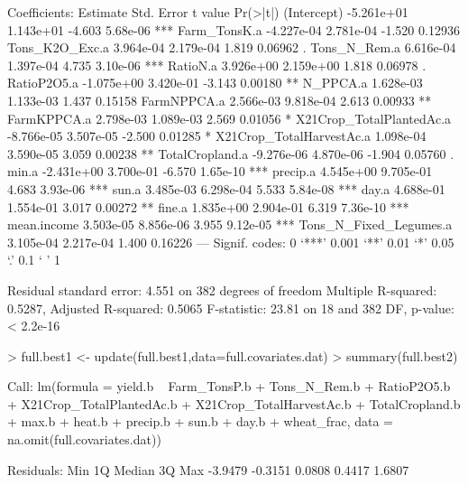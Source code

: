 \documentclass{report}
\begin{document}
\begin{Schunk}
\begin{Soutput}
Coefficients:
                           Estimate Std. Error t value Pr(>|t|)    
(Intercept)              -5.261e+01  1.143e+01  -4.603 5.68e-06 ***
Farm_TonsK.a             -4.227e-04  2.781e-04  -1.520  0.12936    
Tons_K2O_Exc.a            3.964e-04  2.179e-04   1.819  0.06962 .  
Tons_N_Rem.a              6.616e-04  1.397e-04   4.735 3.10e-06 ***
RatioN.a                  3.926e+00  2.159e+00   1.818  0.06978 .  
RatioP2O5.a              -1.075e+00  3.420e-01  -3.143  0.00180 ** 
N_PPCA.a                  1.628e-03  1.133e-03   1.437  0.15158    
FarmNPPCA.a               2.566e-03  9.818e-04   2.613  0.00933 ** 
FarmKPPCA.a               2.798e-03  1.089e-03   2.569  0.01056 *  
X21Crop_TotalPlantedAc.a -8.766e-05  3.507e-05  -2.500  0.01285 *  
X21Crop_TotalHarvestAc.a  1.098e-04  3.590e-05   3.059  0.00238 ** 
TotalCropland.a          -9.276e-06  4.870e-06  -1.904  0.05760 .  
min.a                    -2.431e+00  3.700e-01  -6.570 1.65e-10 ***
precip.a                  4.545e+00  9.705e-01   4.683 3.93e-06 ***
sun.a                     3.485e-03  6.298e-04   5.533 5.84e-08 ***
day.a                     4.688e-01  1.554e-01   3.017  0.00272 ** 
fine.a                    1.835e+00  2.904e-01   6.319 7.36e-10 ***
mean.income               3.503e-05  8.856e-06   3.955 9.12e-05 ***
Tons_N_Fixed_Legumes.a    3.105e-04  2.217e-04   1.400  0.16226    
---
Signif. codes:  0 ‘***’ 0.001 ‘**’ 0.01 ‘*’ 0.05 ‘.’ 0.1 ‘ ’ 1

Residual standard error: 4.551 on 382 degrees of freedom
Multiple R-squared:  0.5287,	Adjusted R-squared:  0.5065 
F-statistic: 23.81 on 18 and 382 DF,  p-value: < 2.2e-16
\end{Soutput}
\begin{Sinput}
> full.best1 <- update(full.best1,data=full.covariates.dat)
> summary(full.best2)
\end{Sinput}
\begin{Soutput}
Call:
lm(formula = yield.b ~ Farm_TonsP.b + Tons_N_Rem.b + RatioP2O5.b + 
    X21Crop_TotalPlantedAc.b + X21Crop_TotalHarvestAc.b + TotalCropland.b + 
    max.b + heat.b + precip.b + sun.b + day.b + wheat_frac, data = na.omit(full.covariates.dat))

Residuals:
    Min      1Q  Median      3Q     Max 
-3.9479 -0.3151  0.0808  0.4417  1.6807 


\end{Soutput}
\end{Schunk}
\end{document}
